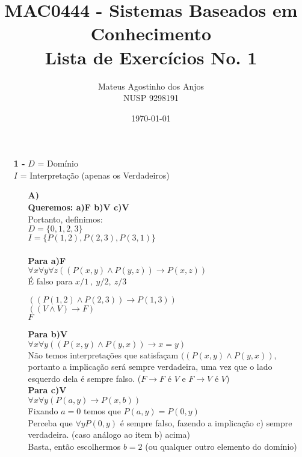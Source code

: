 \documentclass[12pt]{article}
\title{MAC0444 - Sistemas Baseados em Conhecimento \\
Lista de Exercícios No. 1
}
\author{Mateus Agostinho dos Anjos\\NUSP 9298191}
\date{\today}
\begin{document}
	\maketitle
	\begin{itemize}
		\item[\textbf{1 -}]
			\hfill\newline
			$D$ = Domínio\\
			$I$ = Interpretação (apenas os Verdadeiros)\\
			\begin{itemize}
				\item[\textbf{A)}]
					\hfill\\
					\textbf{Queremos: a)F b)V c)V}\\
					Portanto, definimos:\\
					$D = \lbrace 0, 1, 2, 3 \rbrace$\\
					$I = \lbrace P(1, 2), P(2, 3), P(3, 1) \rbrace$\\ \\
					\textbf{Para a)F}\\
					$\forall x \forall y \forall z ((P(x,y) \wedge P(y,z)) \rightarrow P(x, z))$\\
					É falso para $x/1 \ , \ y/2, \ z/3$\\
					\begin{center}	
						$((P(1,2) \wedge P(2,3)) \rightarrow P(1, 3))$\\
						$((V \wedge V) \rightarrow F)$\\
						$F$
					\end{center}
					\newpage
					\textbf{Para b)V}\\
					$\forall x \forall y ((P(x,y) \wedge P(y,x)) \rightarrow x = y)$\\
					Não temos interpretações que satisfaçam $((P(x,y) \wedge P(y,x))$, portanto
					a implicação será sempre verdadeira, uma vez que o lado esquerdo dela é
					sempre falso. ($F \rightarrow F$ é $V$ e $F \rightarrow V$ é $V$)\\
					
					\textbf{Para c)V}\\
					$\forall x \forall y (P(a,y) \rightarrow P(x, b))$\\
					Fixando $a = 0$ temos que $P(a, y) = P(0, y)$\\
					Perceba que $\forall y P(0, y)$ é sempre falso, fazendo a implicação c)
					sempre verdadeira. (caso análogo ao item b) acima)\\
					Basta, então escolhermos $b = 2$ (ou qualquer outro elemento do domínio)
					

\end{itemize}
\end{itemize}
\end{document}
